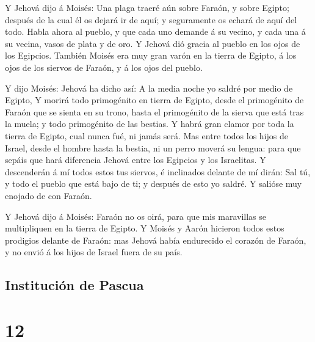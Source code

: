  Y Jehová dijo á Moisés: Una plaga traeré aún sobre
Faraón, y sobre Egipto; después de la cual él os dejará ir de aquí; y
seguramente os echará de aquí del todo.  Habla ahora al
pueblo, y que cada uno demande á su vecino, y cada una á su vecina,
vasos de plata y de oro.  Y Jehová dió gracia al pueblo en
los ojos de los Egipcios. También Moisés era muy gran varón en la tierra
de Egipto, á los ojos de los siervos de Faraón, y á los ojos del pueblo.

 Y dijo Moisés: Jehová ha dicho así: A la media noche yo
saldré por medio de Egipto,  Y morirá todo primogénito en
tierra de Egipto, desde el primogénito de Faraón que se sienta en su
trono, hasta el primogénito de la sierva que está tras la muela; y todo
primogénito de las bestias.  Y habrá gran clamor por toda
la tierra de Egipto, cual nunca fué, ni jamás será.  Mas
entre todos los hijos de Israel, desde el hombre hasta la bestia, ni un
perro moverá su lengua: para que sepáis que hará diferencia Jehová entre
los Egipcios y los Israelitas.  Y descenderán á mí todos
estos tus siervos, é inclinados delante de mí dirán: Sal tú, y todo el
pueblo que está bajo de ti; y después de esto yo saldré. Y salióse muy
enojado de con Faraón.

 Y Jehová dijo á Moisés: Faraón no os oirá, para que mis
maravillas se multipliquen en la tierra de Egipto.  Y
Moisés y Aarón hicieron todos estos prodigios delante de Faraón: mas
Jehová había endurecido el corazón de Faraón, y no envió á los hijos de
Israel fuera de su país.

\hypertarget{instituciuxf3n-de-pascua}{%
\subsection{Institución de Pascua}\label{instituciuxf3n-de-pascua}}

\hypertarget{section-11}{%
\section{12}\label{section-11}}

